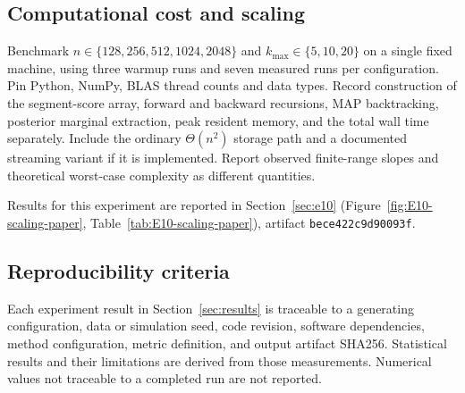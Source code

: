 \subsection{Computational cost and scaling}
Benchmark $n\in\{128,256,512,1024,2048\}$ and
$k_{\max}\in\{5,10,20\}$ on a single fixed machine, using three warmup
runs and seven measured runs per configuration. Pin Python, NumPy, BLAS
thread counts and data types. Record construction of the segment-score array,
forward and backward recursions, MAP backtracking, posterior marginal
extraction, peak resident memory, and the total wall time separately. Include
the ordinary $\Theta(n^2)$ storage path and a documented streaming variant if
it is implemented. Report observed finite-range slopes and theoretical
worst-case complexity as different quantities.

Results for this experiment are reported in Section~\ref{sec:e10} (Figure~\ref{fig:E10-scaling-paper}, Table~\ref{tab:E10-scaling-paper}), artifact \texttt{bece422c9d90093f}.

\subsection{Reproducibility criteria}
Each experiment result in Section~\ref{sec:results} is traceable to a generating
configuration, data or simulation seed, code revision, software dependencies,
method configuration, metric definition, and output artifact SHA256. Statistical
results and their limitations are derived from those measurements. Numerical
values not traceable to a completed run are not reported.
